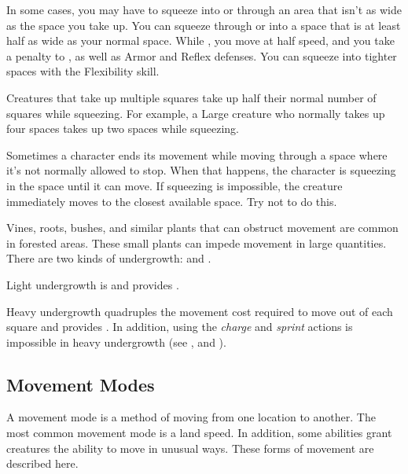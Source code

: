         \label{Squeezing}
        In some cases, you may have to squeeze into or through an area that isn't as wide as the space you take up.
        You can squeeze through or into a space that is at least half as wide as your normal space.
        While \squeezing, you move at half speed, and you take a  penalty to , as well as Armor and Reflex defenses.
        You can squeeze into tighter spaces with the Flexibility skill.

        Creatures that take up multiple squares take up half their normal number of squares while squeezing. For example, a Large creature who normally takes up four spaces takes up two spaces while squeezing.

         Sometimes a character ends its movement while moving through a space where it's not normally allowed to stop. When that happens, the character is squeezing in the space until it can move. If squeezing is impossible, the creature immediately moves to the closest available space. Try not to do this.

        \label{Undergrowth} Vines, roots, bushes, and similar plants that can obstruct movement are common in forested areas.
        These small plants can impede movement in large quantities.
        There are two kinds of undergrowth:  and .

        \label{Light Undergrowth}
        Light undergrowth is  and provides .

        \label{Heavy Undergrowth}
        Heavy undergrowth quadruples the movement cost required to move out of each square and provides .
        In addition, using the \textit{charge} and \textit{sprint} actions is impossible in heavy undergrowth (see , and ).

    \subsection{Movement Modes}\label{Movement Modes}
        A movement mode is a method of moving from one location to another.
        The most common movement mode is a land speed.
        In addition, some abilities grant creatures the ability to move in unusual ways.
        These forms of movement are described here.

